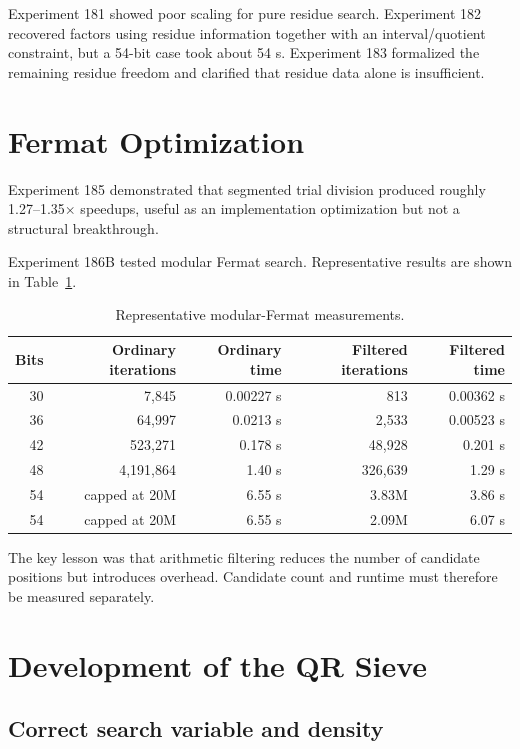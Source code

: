 \documentclass[11pt,a4paper]{article}
\begin{document}
Experiment 181 showed poor scaling for pure residue search. Experiment 182 recovered factors using residue information together with an interval/quotient constraint, but a 54-bit case took about 54 s. Experiment 183 formalized the remaining residue freedom and clarified that residue data alone is insufficient.

\section{Fermat Optimization}

Experiment 185 demonstrated that segmented trial division produced roughly 1.27--1.35$\times$ speedups, useful as an implementation optimization but not a structural breakthrough.

Experiment 186B tested modular Fermat search. Representative results are shown in Table~\ref{tab:modfermat}.

\begin{table}[H]
\centering
\caption{Representative modular-Fermat measurements.}
\label{tab:modfermat}
\begin{tabular}{rrrrr}
\toprule
Bits & Ordinary iterations & Ordinary time & Filtered iterations & Filtered time\\
\midrule
30 & 7,845 & 0.00227 s & 813 & 0.00362 s\\
36 & 64,997 & 0.0213 s & 2,533 & 0.00523 s\\
42 & 523,271 & 0.178 s & 48,928 & 0.201 s\\
48 & 4,191,864 & 1.40 s & 326,639 & 1.29 s\\
54 & capped at 20M & 6.55 s & 3.83M & 3.86 s\\
54 & capped at 20M & 6.55 s & 2.09M & 6.07 s\\
\bottomrule
\end{tabular}
\end{table}

The key lesson was that arithmetic filtering reduces the number of candidate positions but introduces overhead. Candidate count and runtime must therefore be measured separately.

\section{Development of the QR Sieve}

\subsection{Correct search variable and density}
\end{document}
